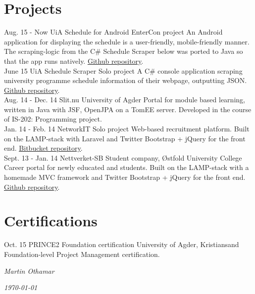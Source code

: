 \documentclass[]{cv-class}
\begin{document}
\section{Projects}
\begin{entrylist}
  \entry
    {Aug. 15 - Now}
    {UiA Schedule for Android}
    {EnterCon project}
    {An Android application for displaying the schedule is a user-friendly,
    mobile-friendly manner. The scraping-logic from the C\# Schedule Scraper below
    was ported to Java so that the app runs natively.
    \underline{\href{https://github.com/martinothamar/UiA-Timeplan-Android}
    {Github repository}}.\\}
  \entry
    {June 15}
    {UiA Schedule Scraper}
    {Solo project}
    {A C\# console application scraping university programme schedule information
    of their webpage, outputting JSON.
    \underline{\href{https://github.com/martinothamar/UiA-ScheduleGrabber}
    {Github repository}}.\\}
  \entry
    {Aug. 14 - Dec. 14}
    {Slit.nu}
    {University of Agder}
    {Portal for module based learning, written in Java with JSF, OpenJPA on a TomEE server.
    Developed in the course of IS-202: Programming project.\\}
  \entry
    {Jan. 14 - Feb. 14}
    {NetworkIT}
    {Solo project}
    {Web-based recruitment platform.
    Built on the LAMP-stack with Laravel and Twitter Bootstrap + jQuery for the front end.
    \underline{\href{https://bitbucket.org/martinothamar/networkit}{Bitbucket repository}}.\\}
  \entry
    {Sept. 13 - Jan. 14}
    {Nettverket-SB}
    {Student company, {{\O}}stfold University College}
    {Career portal for newly educated and students.
    Built on the LAMP-stack with a homemade MVC framework and 
    Twitter Bootstrap + jQuery for the front end.
    \underline{\href{https://github.com/martinothamar/Nettverket-SB}{Github repository}}.}
\end{entrylist}


\section{Certifications}
\begin{entrylist}
  \entry
    {Oct. 15}
    {PRINCE2 Foundation certification}
    {University of Agder, Kristiansand}
    {Foundation-level Project Management certification.}
\end{entrylist}

\vspace{1.5cm}
\begin{flushright}
\emph{Martin Othamar}
\end{flushright}
\begin{flushright}
\emph{\today}
\end{flushright}
\end{document}
